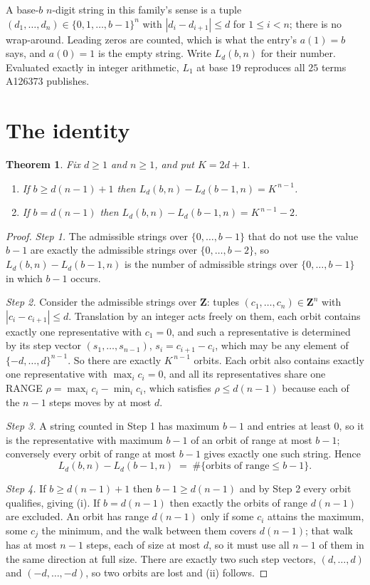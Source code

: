 \documentclass[11pt,a4paper]{article}
\theoremstyle{plain}
\newtheorem{theorem}{Theorem}
\theoremstyle{definition}
\begin{document}
A base-$b$ $n$-digit string in this family's sense is a tuple
$(d_1,\dots,d_n)\in\{0,1,\dots,b-1\}^{n}$ with $|d_i-d_{i+1}|\le d$ for $1\le i<n$; there
is no wrap-around. Leading zeros are counted, which is what the entry's $a(1)=b$ says, and
$a(0)=1$ is the empty string. Write $L_d(b,n)$ for their number. Evaluated exactly in integer
arithmetic, $L_{1}$ at base $19$ reproduces all $25$ terms A126373 publishes.

\section{The identity}

\begin{theorem}
Fix $d\ge1$ and $n\ge1$, and put $K=2d+1$.
\begin{enumerate}
\item[(i)] If $b\ge d(n-1)+1$ then $L_d(b,n)-L_d(b-1,n)=K^{\,n-1}$.
\item[(ii)] If $b=d(n-1)$ then $L_d(b,n)-L_d(b-1,n)=K^{\,n-1}-2$.
\end{enumerate}
\end{theorem}

\begin{proof}
\emph{Step 1.} The admissible strings over $\{0,\dots,b-1\}$ that do not use the value $b-1$
are exactly the admissible strings over $\{0,\dots,b-2\}$, so $L_d(b,n)-L_d(b-1,n)$ is the
number of admissible strings over $\{0,\dots,b-1\}$ in which $b-1$ occurs.

\emph{Step 2.} Consider the admissible strings over $\mathbf{Z}$: tuples
$(c_1,\dots,c_n)\in\mathbf{Z}^{n}$ with $|c_i-c_{i+1}|\le d$. Translation by an integer acts
freely on them, each orbit contains exactly one representative with $c_1=0$, and such a
representative is determined by its step vector $(s_1,\dots,s_{n-1})$, $s_i=c_{i+1}-c_i$,
which may be any element of $\{-d,\dots,d\}^{n-1}$. So there are exactly $K^{\,n-1}$ orbits.
Each orbit also contains exactly one representative with $\max_i c_i=0$, and all its
representatives share one RANGE $\rho=\max_ic_i-\min_ic_i$, which satisfies
$\rho\le d(n-1)$ because each of the $n-1$ steps moves by at most $d$.

\emph{Step 3.} A string counted in Step 1 has maximum $b-1$ and entries at least $0$, so it is
the representative with maximum $b-1$ of an orbit of range at most $b-1$; conversely every orbit
of range at most $b-1$ gives exactly one such string. Hence
\[
L_d(b,n)-L_d(b-1,n)\;=\;\#\{\text{orbits of range}\le b-1\} .
\]

\emph{Step 4.} If $b\ge d(n-1)+1$ then $b-1\ge d(n-1)$ and by Step 2 every orbit qualifies,
giving (i). If $b=d(n-1)$ then exactly the orbits of range $d(n-1)$ are excluded. An orbit has
range $d(n-1)$ only if some $c_i$ attains the maximum, some $c_j$ the minimum, and the walk
between them covers $d(n-1)$; that walk has at most $n-1$ steps, each of size at most $d$, so it
must use all $n-1$ of them in the same direction at full size. There are exactly two such step
vectors, $(d,\dots,d)$ and $(-d,\dots,-d)$, so two orbits are lost and (ii) follows.
\end{proof}
\end{document}
